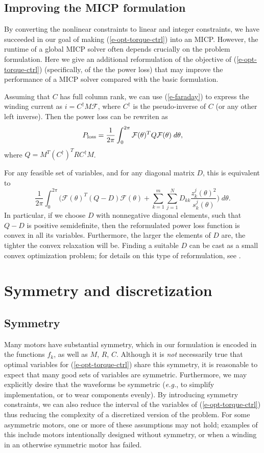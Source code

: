 \documentclass[11pt]{article}
\newcommand{\eg}{{\it e.g.}}
\begin{document}
\subsection{Improving the MICP formulation}
By converting the nonlinear constraints to linear and integer constraints,
we have succeeded in our goal of making (\ref{e-opt-torque-ctrl})
into an MICP.
However, the runtime of a global MICP solver often depends crucially on the problem formulation.
Here we give an additional reformulation of the objective of 
(\ref{e-opt-torque-ctrl})
(specifically, of the the power loss)
that may improve the performance of a MICP solver
compared with the basic formulation.



Assuming that $C$ has full column rank, 
we can use (\ref{e-faraday}) to express the winding current as 
$i = C^\dagger M \mathcal F$,
where $C^\dagger$ is the pseudo-inverse of $C$
(or any other left inverse).
Then the power loss can be rewriten as
\[
P_{\rm loss} = \frac1{2\pi}
\int_0^{2\pi} 
\mathcal F(\theta)^T Q \mathcal F (\theta) \; d\theta,
\]
where $Q = M^T (C^\dagger)^T R C^\dagger M$.

For any feasible set of variables,
and for any diagonal matrix $D$, this is equivalent to
\[
\frac1{2\pi} \int_0^{2\pi} 
\Bigg(
\mathcal F(\theta)^T (Q-D) \mathcal F (\theta) 
+ \sum_{k=1}^m \sum_{j=1}^N D_{kk} \frac{z_k^j(\theta)^2}{s_k^j(\theta)}
\Bigg)
\; d\theta.
\]
In particular, if we choose $D$ with nonnegative diagonal elements,
such that $Q-D$ is positive semidefinite,
then the reformulated power loss function is convex in all its variables.
Furthermore, the larger the elements of $D$ are,
the tighter the convex relaxation will be.
Finding a suitable $D$ can be cast as a small convex optimization problem;
for details on this type of reformulation, see \cite{frangioni2007sdp}.


\section{Symmetry and discretization}

\subsection{Symmetry}
\label{s-symmetry}
Many motors have substantial symmetry,
which in our formulation is encoded in the functions $f_k$, 
as well as $M$, $R$, $C$.
Although it is \emph{not} necessarily true that 
optimal variables for (\ref{e-opt-torque-ctrl}) share this symmetry,
it is reasonable to expect that many good sets of variables are symmetric.
Furthermore, we may explicitly desire that the waveforms be symmetric
(\eg, to simplify implementation, or to wear components evenly).
By introducing symmetry constraints, 
we can also reduce the interval of the variables of (\ref{e-opt-torque-ctrl})
thus reducing the complexity of a 
discretized version of the problem.
For some asymmetric motors,
one or more of these assumptions may not hold;
examples of this include motors intentionally designed without symmetry,
or when a winding in an otherwise symmetric motor has failed.
\end{document}

